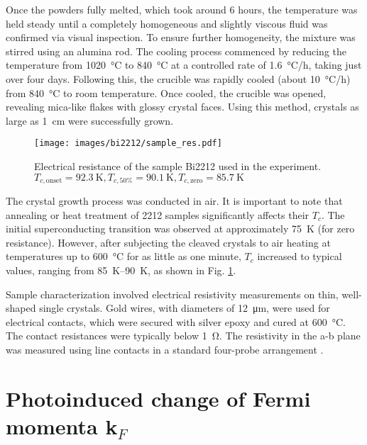 Once the powders fully melted, which took around 6 hours, the temperature was held steady until a completely homogeneous and slightly viscous fluid was confirmed via visual inspection.
To ensure further homogeneity, the mixture was stirred using an alumina rod.
The cooling process commenced by reducing the temperature from \qty{1020}{\degreeCelsius} to \qty{840}{\degreeCelsius} at a controlled rate of \qty{1.6}{\degreeCelsius/\hour}, taking just over four days.
Following this, the crucible was rapidly cooled (about \qty{10}{\degreeCelsius/\hour}) from \qty{840}{\degreeCelsius} to room temperature. Once cooled, the crucible was opened, revealing mica-like flakes with glossy crystal faces. Using this method, crystals as large as \qty{1}{\centi\meter} were successfully grown.

\begin{figure}
	\centering
	\texttt{[image: images/bi2212/sample\_res.pdf]}
	\caption{Electrical resistance of the sample Bi2212 used in the experiment. $T_{c,\text{onset}}=\qty{92.3}{\kelvin}, T_{c,\text{50\%}}=\qty{90.1}{\kelvin}, T_{c,\text{zero}}=\qty{85.7}{\kelvin}$}
	\label{fig:sample_res}
\end{figure}

The crystal growth process was conducted in air.
It is important to note that annealing or heat treatment of 2212 samples significantly affects their $T_c$.
The initial superconducting transition was observed at approximately \qty{75}{\kelvin} (for zero resistance).
However, after subjecting the cleaved crystals to air heating at temperatures up to \qty{600}{\degreeCelsius} for as little as one minute, $T_c$ increased to typical values, ranging from \qtyrange{85}{90}{\kelvin}, as shown in Fig. \ref{fig:sample_res}.

Sample characterization involved electrical resistivity measurements on thin, well-shaped single crystals. Gold wires, with diameters of \qty{12}{\micro\meter}, were used for electrical contacts, which were secured with silver epoxy and cured at \qty{600}{\degreeCelsius}. The contact resistances were typically below \qty{1}{\ohm}. The resistivity in the a-b plane was measured using line contacts in a standard four-probe arrangement \cite{kendziora_composition_1992}.

\section{Photoinduced change of Fermi momenta k$_F$}
\label{sec:larger_effect}

